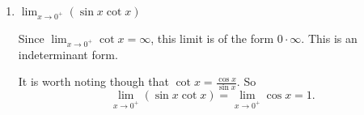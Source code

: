 \documentclass[nooutcomes]{ximera}
\begin{document}
\begin{problem}
\begin{enumerate}
	\item  $\lim_{x \to 0^+} (\sin x \cot x ) $
		\begin{freeResponse}
		Since $\lim_{x \to 0^+} \cot x = \infty$, this limit is of the form $0 \cdot \infty$.  This is an indeterminant form.
		
		It is worth noting though that $\cot x = \frac{\cos x }{\sin x}$.  So
		$$\lim_{x \to 0^+} (\sin x \cot x ) = \lim_{x \to 0^+} \cos x = 1 .$$
		\end{freeResponse}
		
	\end{enumerate}
		
		
\end{problem}
\end{document}
